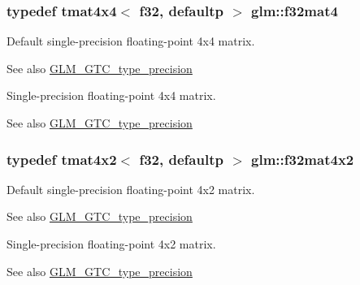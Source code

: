 \subsubsection[{f32mat4}]{\setlength{\rightskip}{0pt plus 5cm}typedef tmat4x4$<$ f32, defaultp $>$ {\bf glm\+::f32mat4}}\label{group__gtc__type__precision_ga47bc5ddfbd368423c9b762c03ba7e77f}
Default single-\/precision floating-\/point 4x4 matrix. \begin{DoxySeeAlso}{See also}
\hyperlink{group__gtc__type__precision}{G\+L\+M\+\_\+\+G\+T\+C\+\_\+type\+\_\+precision}
\end{DoxySeeAlso}
Single-\/precision floating-\/point 4x4 matrix. \begin{DoxySeeAlso}{See also}
\hyperlink{group__gtc__type__precision}{G\+L\+M\+\_\+\+G\+T\+C\+\_\+type\+\_\+precision} 
\end{DoxySeeAlso}
\hypertarget{group__gtc__type__precision_gab531a3d0479121732ae090254e0bd58f}{}
\subsubsection[{f32mat4x2}]{\setlength{\rightskip}{0pt plus 5cm}typedef tmat4x2$<$ f32, defaultp $>$ {\bf glm\+::f32mat4x2}}\label{group__gtc__type__precision_gab531a3d0479121732ae090254e0bd58f}
Default single-\/precision floating-\/point 4x2 matrix. \begin{DoxySeeAlso}{See also}
\hyperlink{group__gtc__type__precision}{G\+L\+M\+\_\+\+G\+T\+C\+\_\+type\+\_\+precision}
\end{DoxySeeAlso}
Single-\/precision floating-\/point 4x2 matrix. \begin{DoxySeeAlso}{See also}
\hyperlink{group__gtc__type__precision}{G\+L\+M\+\_\+\+G\+T\+C\+\_\+type\+\_\+precision} 
\end{DoxySeeAlso}
\hypertarget{group__gtc__type__precision_gad68d998fa74028e02bfadd4778bd549a}{}
